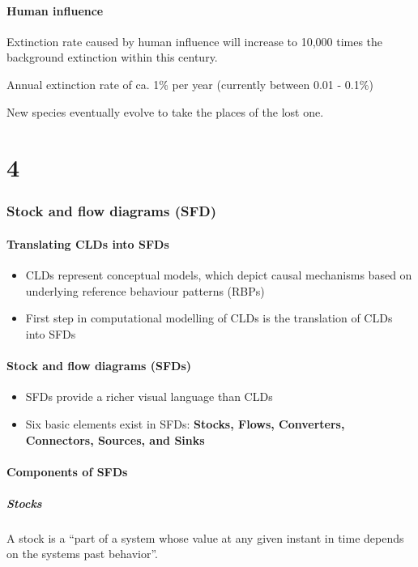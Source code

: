 \documentclass{article}
\begin{document}
\subsection{Human influence}
Extinction rate caused by human influence will increase to 10,000 times the
background extinction within this century.

Annual extinction rate of ca. 1\% per year (currently between 0.01 - 0.1\%)

New species eventually evolve to take the places of the lost one.

\part{4}
\section{Stock and flow diagrams (SFD)}
\subsection{Translating CLDs into SFDs}
\begin{itemize}
    \item CLDs represent conceptual models, which depict causal mechanisms based on underlying reference behaviour patterns (RBPs)
    \item First step in computational modelling of CLDs is the translation of CLDs into SFDs
\end{itemize}

\subsection{Stock and flow diagrams (SFDs)}
\begin{itemize}
    \item SFDs provide a richer visual language than CLDs
    \item Six basic elements exist in SFDs: \textbf{Stocks, Flows, Converters, Connectors, Sources, and Sinks}
\end{itemize}

\subsection{Components of SFDs}
\subsubsection{Stocks}
A stock is a ``part of a system whose value at any given instant in time depends on the systems past behavior''.
\end{document}
